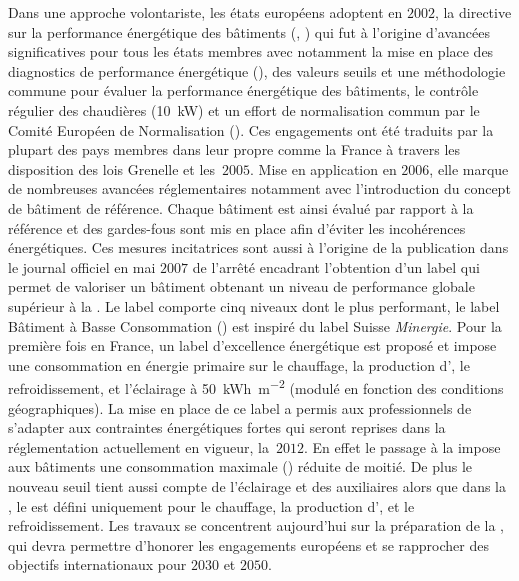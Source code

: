 Dans une approche volontariste, les états européens adoptent en $2002$, la directive sur la
performance énergétique des bâtiments (, \cite{EPBD2002}) qui fut à
l’origine d’avancées significatives pour tous les états membres avec notamment la mise en
place des diagnostics de performance énergétique (), des valeurs seuils et une
méthodologie commune pour évaluer la performance énergétique des bâtiments, le contrôle
régulier des chaudières (\SI{+10}{kW}) et un effort de normalisation commun par le Comité
Européen de Normalisation ().
Ces engagements ont été traduits par la plupart des pays membres dans leur 
propre comme la France à travers les
disposition des lois Grenelle et les \,$2005$.
Mise en application en $2006$, elle marque de nombreuses avancées
réglementaires notamment avec l’introduction du concept de bâtiment de référence. Chaque
bâtiment est ainsi évalué par rapport à la référence et des gardes-fous sont mis en place
afin d’éviter les incohérences énergétiques.
Ces mesures incitatrices sont aussi à l’origine de la publication dans le journal officiel
en mai $2007$ de l’arrêté encadrant l’obtention d’un label  qui permet de valoriser
un bâtiment obtenant un niveau de performance globale supérieur à la .
Le label comporte cinq niveaux dont le plus performant, le label Bâtiment à
Basse Consommation ()
est inspiré du label Suisse \textit{Minergie}. Pour la première fois en France, un
label d’excellence énergétique est proposé et impose une consommation en énergie primaire
sur le chauffage, la production d’, le refroidissement, et l’éclairage à
\SI{50}{kWh\per\metre\squared} (modulé en fonction des conditions géographiques).
La mise en place de ce label a permis aux professionnels de s’adapter aux contraintes
énergétiques fortes qui seront reprises dans la réglementation actuellement en vigueur, la
\,$2012$.
En effet le passage à la  impose aux bâtiments une consommation maximale ()
réduite de moitié. De plus le nouveau seuil tient aussi compte de l’éclairage et des auxiliaires alors
que dans la , le  est défini uniquement pour le
chauffage, la production d’, et le refroidissement. Les travaux se concentrent
aujourd’hui sur la préparation de la , qui devra permettre d’honorer les
engagements européens et se rapprocher des objectifs internationaux pour $2030$ et $2050$.

